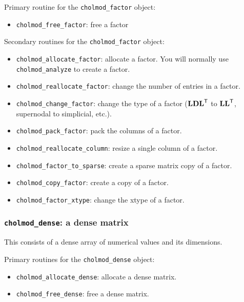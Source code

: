 \documentclass[11pt]{article}
\newcommand{\m}[1]{{\bf{#1}}}       %
\newcommand{\tr}{^{\sf T}}          %
\begin{document}
\vspace{0.1in}
\noindent Primary routine for the {\tt cholmod\_factor} object:
    \begin{itemize}
    \item {\tt cholmod\_free\_factor}: free a factor
    \end{itemize}

\noindent Secondary routines for the {\tt cholmod\_factor} object:
    \begin{itemize}
    \item {\tt cholmod\_allocate\_factor}: allocate a factor.  You will normally use {\tt cholmod\_analyze} to create a factor.
    \item {\tt cholmod\_reallocate\_factor}: change the number of entries in a factor.
    \item {\tt cholmod\_change\_factor}: change the type of a factor ($\m{LDL}\tr$ to $\m{LL}\tr$, supernodal to simplicial, etc.).
    \item {\tt cholmod\_pack\_factor}: pack the columns of a factor.
    \item {\tt cholmod\_reallocate\_column}: resize a single column of a factor.
    \item {\tt cholmod\_factor\_to\_sparse}: create a sparse matrix copy of a factor.
    \item {\tt cholmod\_copy\_factor}: create a copy of a factor.
    \item {\tt cholmod\_factor\_xtype}: change the xtype of a factor.
    \end{itemize}

\subsubsection{{\tt cholmod\_dense}: a dense matrix}
    This consists of a dense array of numerical values and its dimensions.

\vspace{0.1in}
\noindent Primary routines for the {\tt cholmod\_dense} object:
    \begin{itemize}
    \item {\tt cholmod\_allocate\_dense}: allocate a dense matrix.
    \item {\tt cholmod\_free\_dense}: free a dense matrix.
    \end{itemize}
\end{document}
